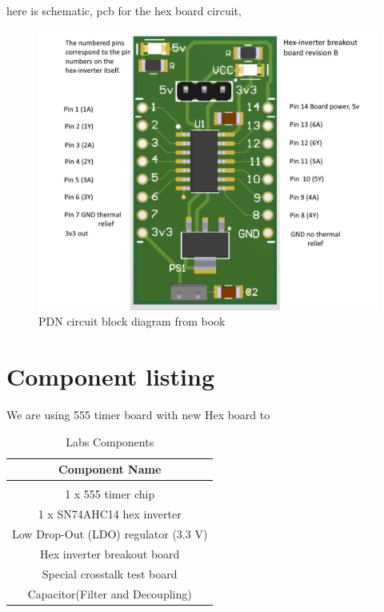 \documentclass[a4paper,11pt]{article}%
\begin{document}
\pagebreak
here is schematic, pcb for the hex board circuit,


\begin{figure}[H]
	\centering
	\includegraphics[scale=0.6]{figures/hex_pcb.png}
	\caption{PDN circuit block diagram from book}
	\label{idealbpfilter}
\end{figure}



\pagebreak

\section{Component listing}

We are using 555 timer board with new Hex board to 

	\begin{table}[H]
		\centering

		\begin{tabular}{c}
			\hline
			\textbf{Component Name}\\\hline
			\\
	1 x 555 timer chip\\
	1 x SN74AHC14 hex inverter \\
	Low Drop-Out (LDO) regulator (3.3 V) \\
	Hex inverter breakout board \\
	Special crosstalk test board \\
	Capacitor(Filter and Decoupling) \\
	\hline\hline
		\end{tabular}
		\caption{Labs Components}
		\label{filterspecs}
	\end{table}
\end{document}
